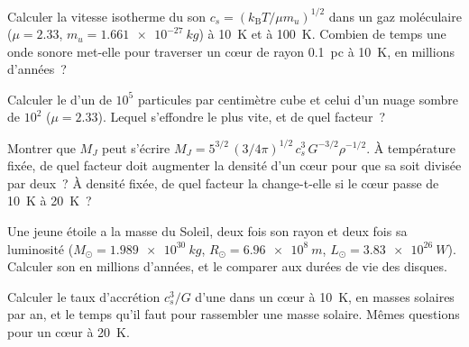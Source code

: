 \begin{exercise}[$\star$]\label{exo:b2:ism-star-formation:3}
Calculer la vitesse isotherme du son $c_s = (k_{\mathrm B}T/\mu m_u)^{1/2}$ dans un gaz
moléculaire ($\mu = 2.33$, $m_u = \qty{1.661e-27}{kg}$) à \qty{10}{K} et à \qty{100}{K}. Combien de temps une onde sonore met-elle pour traverser un cœur de rayon \qty{0.1}{pc}
à \qty{10}{K}, en millions
d'années~?
\end{exercise}

\begin{exercise}[$\star$]\label{exo:b2:ism-star-formation:4}
Calculer le  d'un  de $10^5$ particules par centimètre
cube et celui d'un nuage sombre de $10^2$ ($\mu = 2.33$). Lequel s'effondre le plus vite, et de quel
facteur~?
\end{exercise}

\begin{exercise}[$\star\star$]\label{exo:b2:ism-star-formation:5}
Montrer que $M_J$ peut s'écrire $M_J = 5^{3/2}\,(3/4\pi)^{1/2}\,c_s^3\,G^{-3/2}\rho^{-1/2}$.
À température fixée, de quel facteur doit augmenter la densité d'un cœur pour que sa  soit divisée par deux~? À densité fixée, de quel facteur la  change-t-elle si le cœur passe de \qty{10}{K} à
\qty{20}{K}~?
\end{exercise}

\begin{exercise}[$\star\star$]\label{exo:b2:ism-star-formation:6}
Une jeune étoile a la masse du Soleil, deux fois son rayon et deux fois sa luminosité
($M_\odot = \qty{1.989e30}{kg}$, $R_\odot = \qty{6.96e8}{m}$,
$L_\odot = \qty{3.83e26}{W}$). Calculer son  en millions
d'années, et le comparer aux durées de vie des disques.
\end{exercise}

\begin{exercise}[$\star\star$]\label{exo:b2:ism-star-formation:7}
Calculer le taux d'accrétion $c_s^3/G$ d'une  dans un cœur à \qty{10}{K}, en
masses solaires par an, et le temps qu'il faut pour rassembler une masse solaire. Mêmes questions pour un cœur à
\qty{20}{K}.
\end{exercise}

